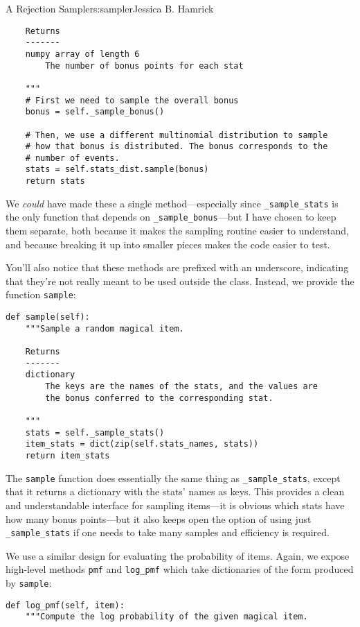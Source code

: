 \begin{aosachapter}{A Rejection Sampler}{s:sampler}{Jessica B. Hamrick}
\begin{verbatim}
    Returns
    -------
    numpy array of length 6
        The number of bonus points for each stat

    """
    # First we need to sample the overall bonus
    bonus = self._sample_bonus()

    # Then, we use a different multinomial distribution to sample
    # how that bonus is distributed. The bonus corresponds to the
    # number of events.
    stats = self.stats_dist.sample(bonus)
    return stats
\end{verbatim}

We \emph{could} have made these a single method---especially since
\texttt{\_sample\_stats} is the only function that depends on
\texttt{\_sample\_bonus}---but I have chosen to keep them separate, both
because it makes the sampling routine easier to understand, and because
breaking it up into smaller pieces makes the code easier to test.

You'll also notice that these methods are prefixed with an underscore,
indicating that they're not really meant to be used outside the class.
Instead, we provide the function \texttt{sample}:

\begin{verbatim}
def sample(self):
    """Sample a random magical item.

    Returns
    -------
    dictionary
        The keys are the names of the stats, and the values are
        the bonus conferred to the corresponding stat.

    """
    stats = self._sample_stats()
    item_stats = dict(zip(self.stats_names, stats))
    return item_stats
\end{verbatim}

The \texttt{sample} function does essentially the same thing as
\texttt{\_sample\_stats}, except that it returns a dictionary with the
stats' names as keys. This provides a clean and understandable interface
for sampling items---it is obvious which stats have how many bonus
points---but it also keeps open the option of using just
\texttt{\_sample\_stats} if one needs to take many samples and
efficiency is required.

We use a similar design for evaluating the probability of items. Again,
we expose high-level methods \texttt{pmf} and \texttt{log\_pmf} which
take dictionaries of the form produced by \texttt{sample}:

\begin{verbatim}
def log_pmf(self, item):
    """Compute the log probability of the given magical item.


\end{verbatim}
\end{aosachapter}
